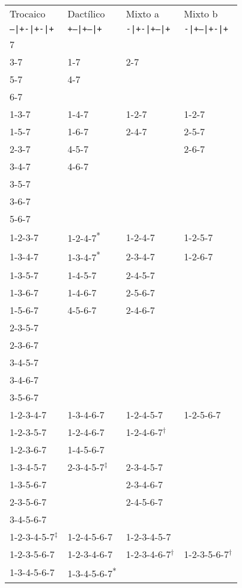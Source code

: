 \begin{table}[h!]
	\centering\small
	\begin{tabular}{llll}
		\toprule
		Trocaico&Dactílico&Mixto a&Mixto b\\
		\texttt{--|+-|+-|+} & \texttt{+--|+--|+} & \texttt{-|+-|+--|+} & \texttt{-|+--|+-|+}\\
		\midrule
		7&&&\\
		3-7&1-7&2-7&\\
		5-7&4-7&&\\
		6-7&&&\\
		1-3-7&1-4-7&1-2-7&1-2-7\\
		1-5-7&1-6-7&2-4-7&2-5-7\\
		2-3-7&4-5-7&&2-6-7\\
		3-4-7&4-6-7&&\\
		3-5-7&&&\\
                3-6-7&&&\\
                5-6-7&&&\\
		1-2-3-7&1-2-4-7\textsuperscript{*}&1-2-4-7&1-2-5-7\\
		1-3-4-7&1-3-4-7\textsuperscript{*}&2-3-4-7&1-2-6-7\\
                1-3-5-7&1-4-5-7&2-4-5-7&\\
                1-3-6-7&1-4-6-7&2-5-6-7&\\
                1-5-6-7&4-5-6-7&2-4-6-7&\\
		2-3-5-7&&&\\
                2-3-6-7&&&\\
                3-4-5-7&&&\\
                3-4-6-7&&&\\
		3-5-6-7&&&\\
                1-2-3-4-7&1-3-4-6-7&1-2-4-5-7&1-2-5-6-7\\
                1-2-3-5-7&1-2-4-6-7&1-2-4-6-7$^\dag$&\\   
                1-2-3-6-7&1-4-5-6-7&&\\
		1-3-4-5-7&2-3-4-5-7$^\ddag$&2-3-4-5-7&\\
		1-3-5-6-7&&2-3-4-6-7&\\
		2-3-5-6-7&&2-4-5-6-7&\\
		3-4-5-6-7&&&\\
                1-2-3-4-5-7$^\ddag$&1-2-4-5-6-7&1-2-3-4-5-7&\\
                1-2-3-5-6-7&1-2-3-4-6-7&1-2-3-4-6-7$^\dag$&1-2-3-5-6-7$^\dag$\\
		1-3-4-5-6-7&1-3-4-5-6-7\textsuperscript{*}&&\\

\end{tabular}
\end{table}
